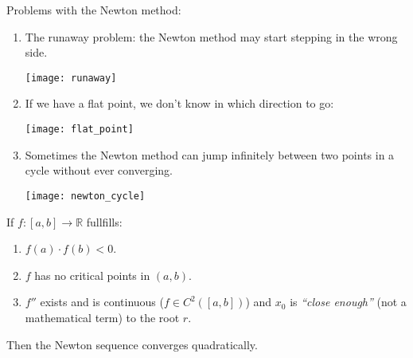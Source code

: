 Problems with the Newton method:
\begin{enumerate}
    \item {
        The runaway problem: the Newton method may start stepping in the wrong side.
        \begin{figure*}[h]
            \centering
            \texttt{[image: runaway]}
        \end{figure*}
    }
    \item {
        If we have a flat point, we don't know in which direction to go:
        \begin{figure*}[h]
            \centering
            \texttt{[image: flat\_point]}
        \end{figure*}
    }
    \item {
        Sometimes the Newton method can jump infinitely between two points in a cycle
        without ever converging.
        \begin{figure*}[h]
            \centering
            \texttt{[image: newton\_cycle]}
        \end{figure*}
    }
\end{enumerate}
\pagebreak
\begin{theorem}
    If $f : [a, b] \to \mathbb{R}$ fullfills:
    \begin{enumerate}
        \item {
            $f(a) \cdot f(b) < 0$.
        }
        \item {
            $f$ has no critical points in $(a, b)$.
        }
        \item {
            $f''$ exists and is continuous ($f \in C^2([a, b])$)
            and $x_0$ is \textit{``close enough''} (not a mathematical term)
            to the root $r$.
        }
    \end{enumerate}
    Then the Newton sequence converges quadratically.
\end{theorem}
